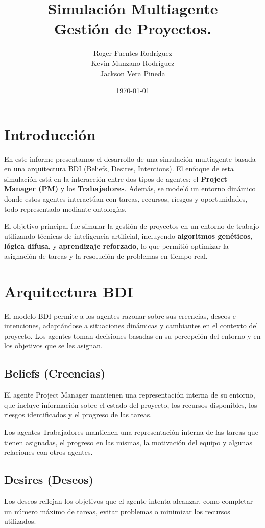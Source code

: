 \documentclass[a4paper, 12pt]{article}
\title{Simulación Multiagente \\ Gestión de Proyectos.}
\author{Roger Fuentes Rodr\'iguez \\ Kevin Manzano Rodr\'iguez \\ Jackson Vera Pineda}
\date{\today}
\begin{document}
\maketitle

\section{Introducción}
En este informe presentamos el desarrollo de una simulación multiagente basada en una arquitectura BDI (Beliefs, Desires, Intentions). El enfoque de esta simulación está en la interacción entre dos tipos de agentes: el \textbf{Project Manager (PM)} y los \textbf{Trabajadores}. Además, se modeló un entorno dinámico donde estos agentes interactúan con tareas, recursos, riesgos y oportunidades, todo representado mediante ontologías.

El objetivo principal fue simular la gestión de proyectos en un entorno de trabajo utilizando técnicas de inteligencia artificial, incluyendo \textbf{algoritmos genéticos}, \textbf{lógica difusa}, y \textbf{aprendizaje reforzado}, lo que permitió optimizar la asignación de tareas y la resolución de problemas en tiempo real.

\section{Arquitectura BDI}
El modelo BDI permite a los agentes razonar sobre sus creencias, deseos e intenciones, adaptándose a situaciones dinámicas y cambiantes en el contexto del proyecto. Los agentes toman decisiones basadas en su percepción del entorno y en los objetivos que se les asignan.

\subsection{Beliefs (Creencias)}
El agente Project Manager mantienen una representación interna de su entorno, que incluye información sobre el estado del proyecto, los recursos disponibles, los riesgos identificados y el progreso de las tareas.

Los agentes Trabajadores mantienen una representación interna de las tareas que tienen asignadas, el progreso en las mismas, la motivación del equipo y algunas relaciones con otros agentes.

\subsection{Desires (Deseos)}
Los deseos reflejan los objetivos que el agente intenta alcanzar, como completar un número máximo de tareas, evitar problemas o minimizar los recursos utilizados.
\end{document}
